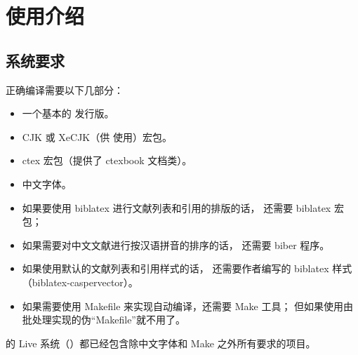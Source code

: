 %
%
%
%
%

\chapter{使用介绍}
	\section{系统要求}\label{sec:req}

	正确编译需要以下几部分：
	\begin{itemize}
		\item 一个基本的  发行版。
		\item CJK 或 XeCJK（供  使用）宏包。
		\item ctex\supercite{ctex,ctex-faq} 宏包（提供了 ctexbook 文档类）。
		\item 中文字体。
		\item 如果要使用 biblatex 进行文献列表和引用的排版的话，
			还需要 biblatex\supercite{biblatex} 宏包；
		\item 如果需要对中文文献进行按汉语拼音的排序的话，
			还需要 biber\supercite{biber} 程序。
		\item 如果使用默认的文献列表和引用样式的话，
			还需要作者编写的 biblatex 样式
			（biblatex-caspervector\supercite{biblatex-caspervector}）。
		\item 如果需要使用 Makefile 来实现自动编译，还需要 Make 工具；
			但如果使用由批处理实现的伪“Makefile”就不用了。
	\end{itemize}

	的  Live 系统（）都已经包含除中文字体和 Make 之外所有要求的项目。%

